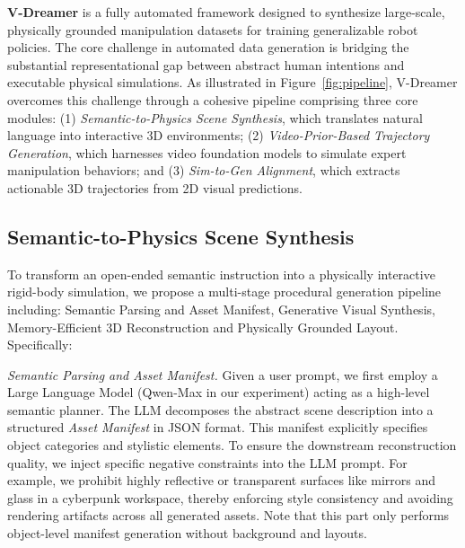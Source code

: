 \textbf{V-Dreamer} is a fully automated framework designed to synthesize large-scale, physically grounded manipulation datasets for training generalizable robot policies. The core challenge in automated data generation is bridging the substantial representational gap between abstract human intentions and executable physical simulations. As illustrated in Figure~\ref{fig:pipeline}, V-Dreamer overcomes this challenge through a cohesive pipeline comprising three core modules: (1) \textit{Semantic-to-Physics Scene Synthesis}, which translates natural language into interactive 3D environments; (2) \textit{Video-Prior-Based Trajectory Generation}, which harnesses video foundation models to simulate expert manipulation behaviors; and (3) \textit{Sim-to-Gen Alignment}, which extracts actionable 3D trajectories from 2D visual predictions.

\subsection{Semantic-to-Physics Scene Synthesis}
\label{sec:scene_gen}

To transform an open-ended semantic instruction 
into a physically interactive rigid-body simulation, we propose a multi-stage procedural generation pipeline including:  Semantic Parsing and Asset Manifest,  Generative Visual Synthesis,  Memory-Efficient 3D Reconstruction and  Physically Grounded Layout. Specifically:

 \textit{Semantic Parsing and Asset Manifest.} Given a user prompt, we first employ a Large Language Model (Qwen-Max\cite{qwen2025qwen25} in our experiment) acting as a high-level semantic planner. The LLM decomposes the abstract scene description into a structured \textit{Asset Manifest} in JSON format. This manifest explicitly specifies object categories and stylistic elements.
To ensure the downstream reconstruction quality, we inject specific negative constraints into the LLM prompt. For example, we prohibit highly reflective or transparent surfaces like mirrors and glass in a cyberpunk workspace, thereby enforcing style consistency and avoiding rendering artifacts across all generated assets. Note that this part only performs object-level manifest generation without background and layouts.

